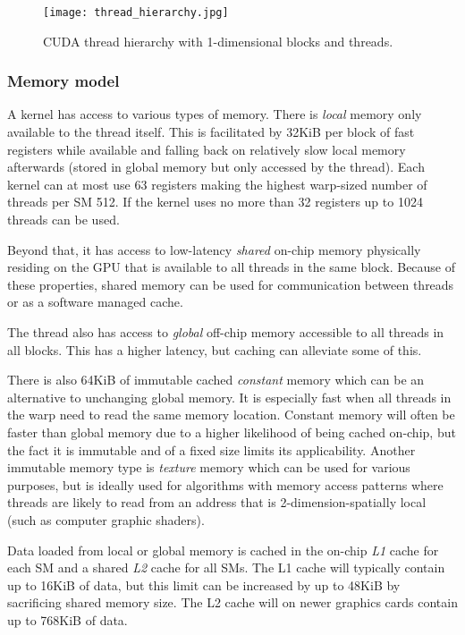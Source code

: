 \begin{figure}[h!]\centering
\texttt{[image: thread\_hierarchy.jpg]}
\caption{CUDA thread hierarchy with 1-dimensional blocks and threads.\label{thread_hierarchy}}
\end{figure}


\subsubsection{Memory model}
A kernel has access to various types of memory.
There is \emph{local} memory only available to the thread itself.
This is facilitated by 32KiB per block of fast registers while available and falling back on relatively slow local memory afterwards (stored in global memory but only accessed by the thread).
Each kernel can at most use 63 registers making the highest warp-sized number of threads per SM 512.
If the kernel uses no more than 32 registers up to 1024 threads can be used.

Beyond that, it has access to low-latency \emph{shared} on-chip memory physically residing on the GPU that is available to all threads in the same block. 
Because of these properties, shared memory can be used for communication between threads or as a software managed cache.

The thread also has access to \emph{global} off-chip memory accessible to all threads in all blocks.
This has a higher latency, but caching can alleviate some of this.

There is also 64KiB of immutable cached \emph{constant} memory which can be an alternative to unchanging global memory.
It is especially fast when all threads in the warp need to read the same memory location.
Constant memory will often be faster than global memory due to a higher likelihood of being cached on-chip, but the fact it is immutable and of a fixed size limits its applicability.
Another immutable memory type is \emph{texture} memory which can be used for various purposes, but is ideally used for algorithms with memory access patterns where threads are likely to read from an address that is 2-dimension-spatially local (such as computer graphic shaders).

Data loaded from local or global memory is cached in the on-chip \emph{L1} cache for each SM and a shared \emph{L2} cache for all SMs.
The L1 cache will typically contain up to 16KiB of data, but this limit can be increased by up to 48KiB by sacrificing shared memory size.
The L2 cache will on newer graphics cards contain up to 768KiB of data.

